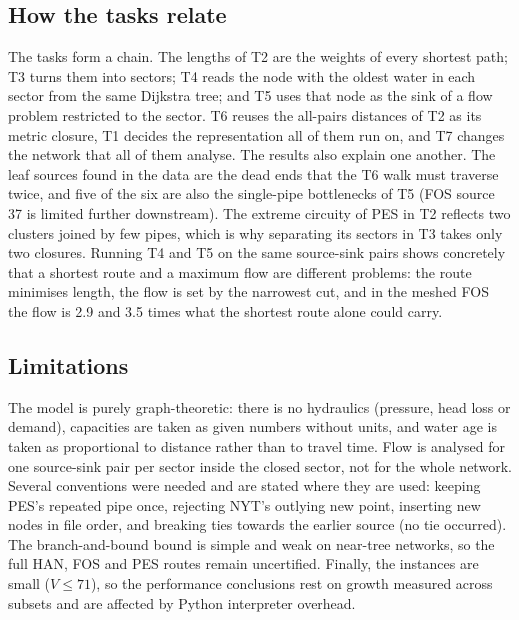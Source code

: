 \subsection{How the tasks relate}
The tasks form a chain. The lengths of T2 are the weights of every shortest path; T3 turns them into sectors; T4 reads the node with the oldest water in each sector from the same Dijkstra tree; and T5 uses that node as the sink of a flow problem restricted to the sector. T6 reuses the all-pairs distances of T2 as its metric closure, T1 decides the representation all of them run on, and T7 changes the network that all of them analyse. The results also explain one another. The leaf sources found in the data are the dead ends that the T6 walk must traverse twice, and five of the six are also the single-pipe bottlenecks of T5 (FOS source 37 is limited further downstream). The extreme circuity of PES in T2 reflects two clusters joined by few pipes, which is why separating its sectors in T3 takes only two closures. Running T4 and T5 on the same source-sink pairs shows concretely that a shortest route and a maximum flow are different problems: the route minimises length, the flow is set by the narrowest cut, and in the meshed FOS the flow is 2.9 and 3.5 times what the shortest route alone could carry.

\subsection{Limitations}
The model is purely graph-theoretic: there is no hydraulics (pressure, head loss or demand), capacities are taken as given numbers without units, and water age is taken as proportional to distance rather than to travel time. Flow is analysed for one source-sink pair per sector inside the closed sector, not for the whole network. Several conventions were needed and are stated where they are used: keeping PES's repeated pipe once, rejecting NYT's outlying new point, inserting new nodes in file order, and breaking ties towards the earlier source (no tie occurred). The branch-and-bound bound is simple and weak on near-tree networks, so the full HAN, FOS and PES routes remain uncertified. Finally, the instances are small ($V\le71$), so the performance conclusions rest on growth measured across subsets and are affected by Python interpreter overhead.
